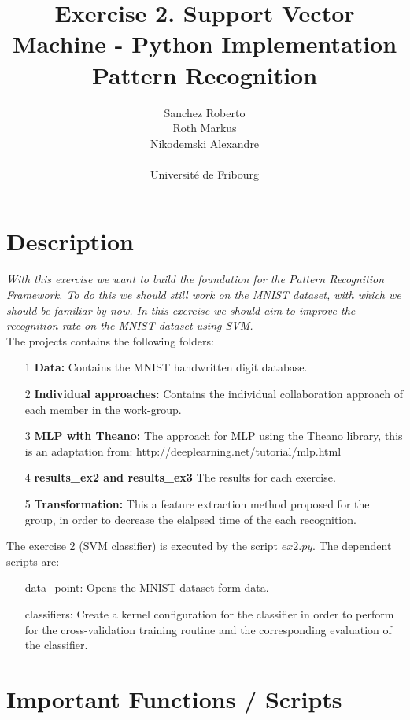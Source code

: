 \documentclass[11pt,a4paper]{article}
\title{Exercise 2. Support Vector Machine - Python Implementation  \\ Pattern Recognition }
\author{Sanchez Roberto  \\ Roth Markus  \\  Nikodemski Alexandre \\ 
\\Université de Fribourg}
\begin{document}
\maketitle 
\section{Description}

\textit{With this exercise we want to build the foundation for the Pattern Recognition Framework. To do this we should still work on the MNIST dataset, with which 
we should be familiar by now. In this exercise we should aim to improve the recognition rate on the MNIST dataset using SVM.
}\\

The projects contains the following folders:

\begin{itemize}
	\item[1] \textbf{Data:} Contains the MNIST handwritten digit database.  
	\item[2] \textbf{Individual approaches:} Contains the individual collaboration approach of each member in the work-group.
	\item[3] \textbf{MLP with Theano:} The approach for MLP using the Theano library, this is an adaptation from: http://deeplearning.net/tutorial/mlp.html 
	\item[4] \textbf{results\_ex2 and results\_ex3} The results for each exercise.
	\item[5] \textbf{Transformation:} This a feature extraction method proposed for the group, in order to decrease the elalpsed time of the each recognition.  
\end{itemize}

The exercise 2 (SVM classifier) is executed by the script $ex2.py$. The dependent scripts are:  

\begin{itemize}
	\item[data\_point:]	Opens the MNIST dataset form data.
	\item[classifiers:] Create a kernel configuration for the classifier in order to perform for the cross-validation training routine and the corresponding evaluation of the classifier.    
\end{itemize}


\section{Important Functions / Scripts}
\end{document}
